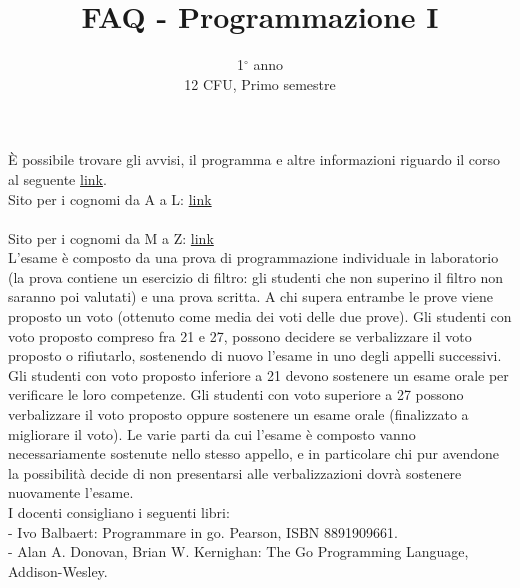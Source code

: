 \documentclass{article}
\title{FAQ - \textbf{Programmazione I}}
\author{
	1$^{\circ}$ anno\\12 CFU, Primo semestre\\
	\date{}
}
\begin{document}
 
	\maketitle
	
	\begin{enumerate}
		
		\rmfamily
		È possibile trovare gli avvisi, il programma e altre informazioni riguardo il corso al seguente \href{http://boldi.di.unimi.it/Corsi/Inf2020/}{link}.\\
		
		Sito per i cognomi da A a L:
		\href{https://atrentinip.ariel.ctu.unimi.it/}{link}\\\\
		Sito per i cognomi da M a Z:
		\href{https://mcasazzapud.ariel.ctu.unimi.it/}{link}\\
		
		L’esame è composto da una prova di programmazione individuale in laboratorio (la prova contiene un esercizio di filtro: gli studenti che non superino il filtro non saranno poi valutati) e una prova scritta. 
		A chi supera entrambe le prove viene proposto un voto (ottenuto come media dei voti delle due prove). 
		Gli studenti con voto proposto compreso fra 21 e 27, possono decidere se verbalizzare il voto proposto o rifiutarlo, sostenendo di nuovo l'esame in uno degli appelli successivi. Gli studenti con voto proposto inferiore a 21 devono sostenere un esame orale per verificare le loro competenze. Gli studenti con voto superiore a 27 possono verbalizzare il voto proposto oppure sostenere un esame orale (finalizzato a migliorare il voto). Le varie parti da cui l'esame è composto vanno necessariamente sostenute nello stesso appello, e in particolare chi pur avendone la possibilità decide di non presentarsi alle verbalizzazioni dovrà sostenere nuovamente l'esame.\\
		
		I docenti consigliano i seguenti libri:\\
		- Ivo Balbaert: Programmare in go. Pearson, ISBN 8891909661.\\
		- Alan A. Donovan, Brian W. Kernighan: The Go Programming Language, Addison-Wesley.\\
		
	\end{enumerate}
	
\end{document}
